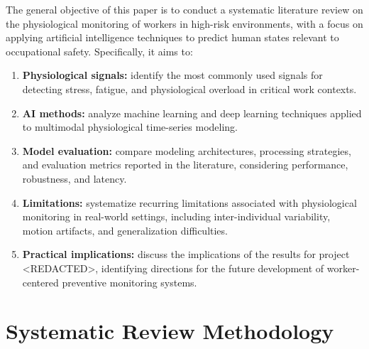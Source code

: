 \documentclass[runningheads]{llncs}
\begin{document}
The general objective of this paper is to conduct a systematic literature review on the physiological monitoring of workers in high-risk environments, with a focus on applying artificial intelligence techniques to predict human states relevant to occupational safety. Specifically, it aims to:
\begin{enumerate}
    \item \textbf{Physiological signals:} identify the most commonly used signals for detecting stress, fatigue, and physiological overload in critical work contexts.
    \item \textbf{AI methods:} analyze machine learning and deep learning techniques applied to multimodal physiological time-series modeling.
    \item \textbf{Model evaluation:} compare modeling architectures, processing strategies, and evaluation metrics reported in the literature, considering performance, robustness, and latency.
    \item \textbf{Limitations:} systematize recurring limitations associated with physiological monitoring in real-world settings, including inter-individual variability, motion artifacts, and generalization difficulties.
    \item \textbf{Practical implications:} discuss the implications of the results for project <REDACTED>, identifying directions for the future development of worker-centered preventive monitoring systems.
\end{enumerate}

\section{Systematic Review Methodology}


\end{document}
